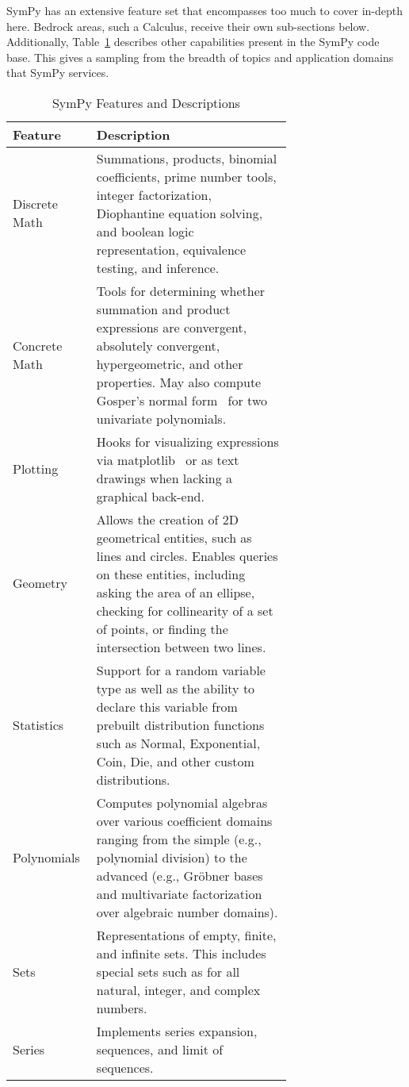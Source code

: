 
SymPy has an extensive feature set that encompasses too much to cover
in-depth here. Bedrock areas, such a Calculus, receive their own sub-sections
below. Additionally, Table~\ref{features-table} describes other capabilities
present in the SymPy code base. This gives a sampling from the breadth of
topics and application domains that SymPy services.


\begin{longtable}[htbc]{|l|p{0.7\linewidth}|}
\caption{SymPy Features and Descriptions\label{features-table}}\\
\hline
\textbf{Feature} & \textbf{Description} \\
\hline
Discrete Math & Summations, products, binomial coefficients,
    prime number tools, integer factorization, Diophantine equation solving, and
    boolean logic representation, equivalence testing, and inference.\\
Concrete Math & Tools for determining whether summation and product
    expressions are convergent, absolutely convergent, hypergeometric, and
    other properties. May also compute Gosper's normal form~\cite{petkovvsek1996bak} for two univariate polynomials.\\
Plotting & Hooks for visualizing expressions via matplotlib~\cite{Hunter:2007}
    or as text drawings when lacking a graphical back-end.\\
Geometry & Allows the creation of 2D geometrical entities,
    such as lines and circles. Enables queries on these entities, including
    asking the area of an ellipse, checking for collinearity of a set of
    points, or finding the intersection between two lines.\\
Statistics & Support for a random variable type as well as the ability to
    declare this variable from prebuilt distribution functions such as
    Normal, Exponential, Coin, Die, and other custom distributions.\\
Polynomials & Computes polynomial algebras over various coefficient domains
    ranging from the simple (e.g., polynomial division) to the advanced
    (e.g., Gr\"obner bases~\cite{adams1994introduction} and multivariate
    factorization over algebraic number domains).\\
Sets & Representations of empty, finite, and infinite sets. This includes
    special sets such as for all natural, integer, and complex numbers.\\
Series & Implements series expansion, sequences, and limit of sequences.

\end{longtable}
